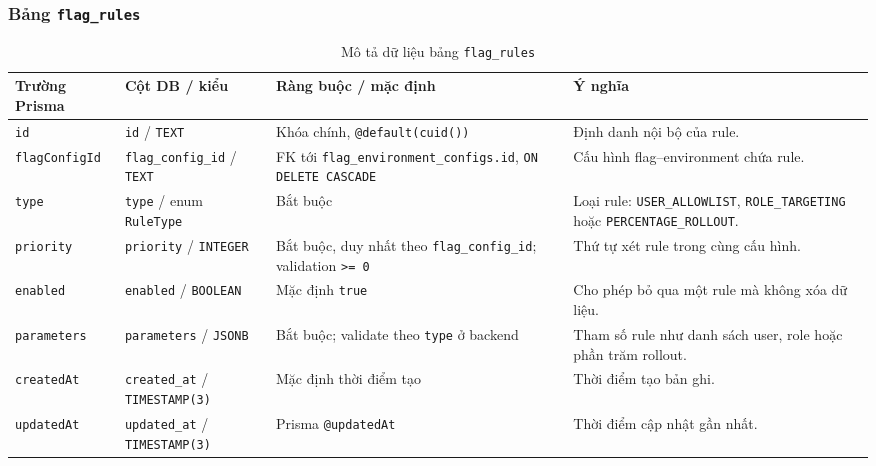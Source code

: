 \subsubsection{Bảng \texttt{flag\_rules}}

\begin{table}[H]
    \centering
    \caption{Mô tả dữ liệu bảng \texttt{flag\_rules}}
    \label{tab:db-flag-rules}
    \begingroup
    \singlespacing
    \scriptsize
    \setlength{\tabcolsep}{3pt}
    \renewcommand{\arraystretch}{1.12}
    \begin{tabular}{p{} p{} p{} p{}}
        \toprule
        \textbf{Trường Prisma} & \textbf{Cột DB / kiểu} & \textbf{Ràng buộc / mặc định} & \textbf{Ý nghĩa} \\
        \midrule
        \texttt{id} & \texttt{id} / \texttt{TEXT} & Khóa chính, \texttt{@default(cuid())} & Định danh nội bộ của rule. \\
        \texttt{flagConfigId} & \texttt{flag\_config\_id} / \texttt{TEXT} & FK tới \texttt{flag\_environment\_configs.id}, \texttt{ON DELETE CASCADE} & Cấu hình flag--environment chứa rule. \\
        \texttt{type} & \texttt{type} / enum \texttt{RuleType} & Bắt buộc & Loại rule: \texttt{USER\_ALLOWLIST}, \texttt{ROLE\_TARGETING} hoặc \texttt{PERCENTAGE\_ROLLOUT}. \\
        \texttt{priority} & \texttt{priority} / \texttt{INTEGER} & Bắt buộc, duy nhất theo \texttt{flag\_config\_id}; validation \texttt{>= 0} & Thứ tự xét rule trong cùng cấu hình. \\
        \texttt{enabled} & \texttt{enabled} / \texttt{BOOLEAN} & Mặc định \texttt{true} & Cho phép bỏ qua một rule mà không xóa dữ liệu. \\
        \texttt{parameters} & \texttt{parameters} / \texttt{JSONB} & Bắt buộc; validate theo \texttt{type} ở backend & Tham số rule như danh sách user, role hoặc phần trăm rollout. \\
        \texttt{createdAt} & \texttt{created\_at} / \texttt{TIMESTAMP(3)} & Mặc định thời điểm tạo & Thời điểm tạo bản ghi. \\
        \texttt{updatedAt} & \texttt{updated\_at} / \texttt{TIMESTAMP(3)} & Prisma \texttt{@updatedAt} & Thời điểm cập nhật gần nhất. \\
        \bottomrule
    \end{tabular}
    \endgroup
\end{table}

